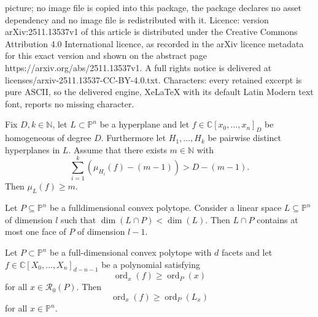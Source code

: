\documentclass[10pt,a4paper]{amsart}
\newcommand{\C}{{\mathbb C}}
\newcommand{\N}{{\mathbb N}}
\newcommand{\cR}{{\mathcal R}}
\newcommand{\ord}{\operatorname{ord}}
\newcommand{\pp}{\mathbb{P}}
\begin{document}
picture; no image file is copied into this package, the package declares no asset dependency and no image file is redistributed with it. Licence: version arXiv:2511.13537v1 of this article is distributed under the Creative Commons Attribution 4.0 International licence, as recorded in the arXiv licence metadata for this exact version and shown on the abstract page https://arxiv.org/abs/2511.13537v1. A full rights notice is delivered at licenses/arxiv-2511.13537-CC-BY-4.0.txt. Characters: every retained excerpt is pure ASCII, so the delivered engine, XeLaTeX with its default Latin Modern text font, reports no missing character.
\begin{cor} \label{cor: van_order_Mult}
 Fix $D,k\in \N$, let $L\subset \pp^{n}$ be a hyperplane and let $f \in \C[x_0, \dots, x_{n}]_D$ be homogeneous of degree $D$. Furthermore let $H_1, \dots, H_k$ be pairwise distinct hyperplanes in $L$. Assume that there exists $m \in \N$ with
 \begin{equation*}
     \sum_{i=1}^k (\mu_{H_i}(f)-(m-1)) > D - (m -1).
 \end{equation*}
 Then $\mu_L(f) \geq m$.
\end{cor}

\begin{lem}
\label{lem: convpol_noninc}
Let $P\subseteq \pp^n$ be a fulldimensional convex polytope.
 Consider a linear space $L \subseteq \pp^n$ of dimension $l$ such that $\dim(L\cap P)< \dim(L)$. Then $L\cap P$ contains at most one face of $P$ of dimension $l-1$.
\end{lem}

\begin{thm} \label{thm:pointresidual}
 Let $P \subset \pp^n$ be a full-dimensional convex polytope with $d$ facets and let $f \in \C[X_0, \dots, X_n]_{d-n-1}$ be a polynomial satisfying
 \begin{equation*}
     \ord_x(f) \geq \ord_P(x)
 \end{equation*}
 for all $x \in \cR_0(P)$. Then
 \begin{equation*}
     \ord_x(f) \geq \ord_P(L_x)
 \end{equation*}
 for all $x \in \pp^n$.
\end{thm}
\end{document}
